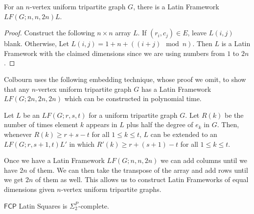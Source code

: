 \documentclass[runningheads,a4paper]{llncs}
\begin{document}
\begin{lemma}
For an $n$-vertex uniform tripartite graph $G$, there is a Latin Framework $LF(G;n,n,2n) L$. 
\end{lemma} 

\begin{proof}
Construct the following $n \times n$ array $L$. If $(r_i, c_j) \in E$, leave $L(i,j)$ blank. Otherwise, Let $L(i,j) = 1 + n + ((i+j) \mod n)$. Then $L$ is a Latin Framework with the claimed dimensions since we are using numbers from $1$ to $2n$. 
\end{proof}

Colbourn uses the following embedding technique, whose proof we omit, to show that any $n$-vertex uniform tripartite graph $G$ has a Latin Framework $LF(G;2n,2n,2n)$ which can be constructed in polynomial time. 

\begin{lemma}
Let $L$ be an $LF(G;r,s,t)$ for a uniform tripartite graph $G$. Let $R(k)$ be the number of times element $k$ appears in $L$ plus half the degree of $e_k$ in $G$. Then, whenever $R(k) \geq r + s - t$ for all $1 \leq k \leq t$, $L$ can be extended to an $LF(G;r, s+1, t) L'$ in which $R'(k) \geq r + (s+1) - t$ for all $1 \leq k \leq t$. 
\end{lemma} 

Once we have a Latin Framework $LF(G;n, n, 2n)$ we can add columns until we have $2n$ of them. We can then take the transpose of the array and add rows until we get $2n$ of them as well. This allows us to construct Latin Frameworks of equal dimensions given $n$-vertex uniform tripartite graphs. 

\begin{theorem}
$\mathsf{FCP}$ Latin Squares is $\Sigma_2^P$-complete.
\end{theorem}
\end{document}
